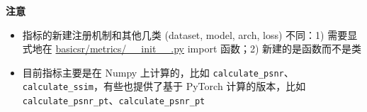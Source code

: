 \documentclass[../main.tex]{subfiles}
\begin{document}
\begin{note} %
    \textbf{注意}

    \begin{itemize}
    \item 指标的新建注册机制和其他几类 (dataset, model, arch, loss) 不同：1) 需要显式地在 \href{https://github.com/XPixelGroup/BasicSR/tree/master/basicsr/metrics/__init__.py}{basicsr/metrics/\_\_init\_\_.py} import 函数；2) 新建的是函数而不是类
    \item 目前指标主要是在 Numpy 上计算的，比如 \texttt{calculate\_psnr}、\texttt{calculate\_ssim}，有些也提供了基于 PyTorch 计算的版本，比如 \texttt{calculate\_psnr\_pt}、\texttt{calculate\_psnr\_pt}
\end{itemize}
\end{note}
\end{document}

